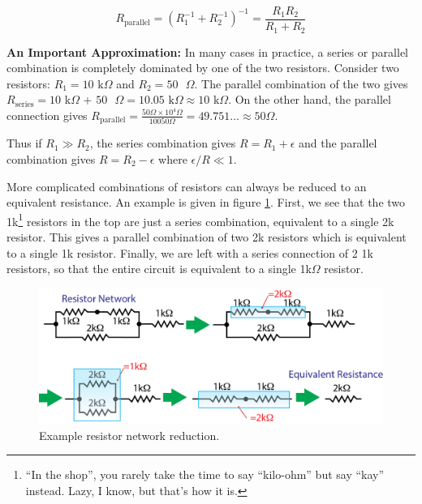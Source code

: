 \documentclass{tufte-book}
\begin{document}
\begin{equation}\label{eq:series_res}
\boxed{R_{\text{parallel}} = \left(R_1^{-1}+R_2^{-1}\right)^{-1} = \frac{R_1R_2}{R_1+R_2}}
\end{equation}

\textbf{An Important Approximation:} In many cases in practice, a series or parallel combination is completely dominated by one of the two resistors. Consider two resistors: $R_1 = 10\text{ k}\Omega$ and  $R_2 = 50\text{ }\Omega$. The parallel combination of the two gives $R_{\text{series}} = 10$ k$\Omega$ + $50\text{ }\Omega = 10.05\text{ k}\Omega \approx 10\text{ k}\Omega$. On the other hand, the parallel connection gives $ R_{\text{parallel}} = \frac{50\Omega\times10^4\Omega}{10050\Omega} = 49.751\ldots \approx 50\Omega$. 

\noindent Thus if $R_1\gg R_2$, the series combination gives $R = R_1 + \epsilon$ and the parallel combination gives $R = R_2-\epsilon$ where $\epsilon/R\ll1$.

More complicated combinations of resistors can always be reduced to an equivalent resistance. An example is given in figure \ref{fig:ex_resnet}. First, we see that the two 1k\footnote{``In the shop'', you rarely take the time to say ``kilo-ohm'' but say ``kay'' instead. Lazy, I know, but that's how it is.} resistors in the top are just a series combination, equivalent to a single 2k resistor. This gives a parallel combination of two 2k resistors which is equivalent to a single 1k resistor. Finally, we are left with a series connection of 2 1k resistors, so that the entire circuit is equivalent to a single 1k$\Omega$ resistor.

\begin{figure}[h]
\caption{Example resistor network reduction.}
\label{fig:ex_resnet}
\begin{center}
\includegraphics[width=\textwidth]{ex_resnet.png}
\end{center}
\end{figure}
\end{document}
